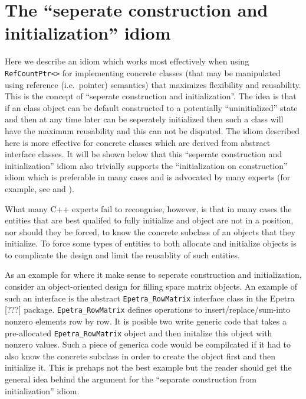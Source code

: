 %
\section{The ``seperate construction and initialization'' idiom}
\label{rcp:apdx:sep-construct-init}
%

Here we describe an idiom which works most effectively when using
{}\texttt{RefCountPtr<>} for implementing concrete classes (that may
be manipulated using reference (i.e.~pointer) semantics) that
maximizes flexibility and reusability.  This is the concept of
``seperate construction and initialization''.  The idea is that if an
class object can be default constructed to a potentially
``uninitialized'' state and then at any time later can be seperately
initialized then such a class will have the maximum reusability and
this can not be disputed.  The idiom described here is more effective
for concrete classes which are derived from abstract interface
classes.  It will be shown below that this ``seperate construction and
initialization'' idiom also trivially supports the ``initialization
on construction'' idiom which is preferable in many cases and is
advocated by many experts (for example, see {}\cite[Section
10.2.3]{ref:stroustrup_2000} and {}\cite[Item 4]{ref:meyers_1996}).

What many C++ experts fail to recongnise, however, is that in many
cases the entities that are best qualifed to fully initialize and
object are not in a position, nor should they be forced, to know the
concrete subclass of an objects that they initialize.  To force some
types of entities to both allocate and initialize objects is to complicate the
design and limit the reusablity of such entities.

As an example for where it make sense to seperate construction and
initialization, consider an object-oriented design for filling spare
matrix objects.  An example of such an interface is the abstract
{}\texttt{Epetra\_\-Row\-Matrix} interface class in the Epetra [???]
package.  {}\texttt{Epetra\_\-Row\-Matrix} defines operations to
insert/replace/sum-into nonzero elements row by row.  It is posible
two write generic code that takes a pre-allocated
{}\texttt{Epetra\_\-Row\-Matrix} object and then initalize this object
with nonzero values.  Such a piece of generica code would be
compilcated if it had to also know the concrete subclass in order to
create the object first and then initialize it.  This is prehaps not
the best example but the reader should get the general idea behind the
argument for the ``separate construction from initialization'' idiom.


